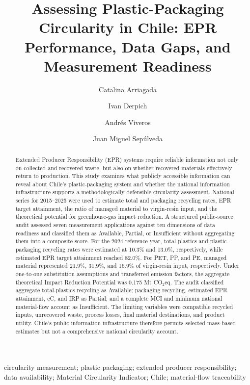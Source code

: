 \documentclass[review,10pt]{elsarticle}
\newcommand{\revpar}[1]{#1\par\medskip}
\newcommand{\revtitle}[1]{#1}
\begin{document}
\justifying
\begin{frontmatter}

\title{\revtitle{Assessing Plastic-Packaging Circularity in Chile: EPR Performance, Data Gaps, and Measurement Readiness}}

\author[1]{Catalina Arriagada}
\author[1]{Ivan Derpich}
\author[1]{Andrés Viveros}
\author[1]{Juan Miguel Sepúlveda}
\address{Departamento de Ingeniería Industrial, Universidad de Santiago de Chile, Santiago, Chile}

\begin{abstract}
\revpar{Extended Producer Responsibility (EPR) systems require reliable information not only on collected and recovered waste, but also on whether recovered materials effectively return to production. This study examines what publicly accessible information can reveal about Chile's plastic-packaging system and whether the national information infrastructure supports a methodologically defensible circularity assessment. National series for 2015--2025 were used to estimate total and packaging recycling rates, EPR target attainment, the ratio of managed material to virgin-resin input, and the theoretical potential for greenhouse-gas impact reduction. A structured public-source audit assessed seven measurement applications against ten dimensions of data readiness and classified them as Available, Partial, or Insufficient without aggregating them into a composite score. For the 2024 reference year, total-plastics and plastic-packaging recycling rates were estimated at 10.3\% and 13.0\%, respectively, while estimated EPR target attainment reached 82.0\%. For PET, PP, and PE, managed material represented 21.9\%, 31.9\%, and 16.9\% of virgin-resin input, respectively. Under one-to-one substitution assumptions and transferred emission factors, the aggregate theoretical Impact Reduction Potential was 0.175 Mt CO$_2$eq. The audit classified aggregate total-plastics recycling as Available; packaging recycling, estimated EPR attainment, eC, and IRP as Partial; and a complete MCI and minimum national material-flow account as Insufficient. The limiting variables were compatible recycled inputs, unrecovered waste, process losses, final material destinations, and product utility. Chile's public information infrastructure therefore permits selected mass-based estimates but not a comprehensive national circularity account.}
\end{abstract}

\begin{keyword}
circularity measurement; plastic packaging; extended producer responsibility; data availability; Material Circularity Indicator; Chile; material-flow traceability
\end{keyword}

\end{frontmatter}
\end{document}
